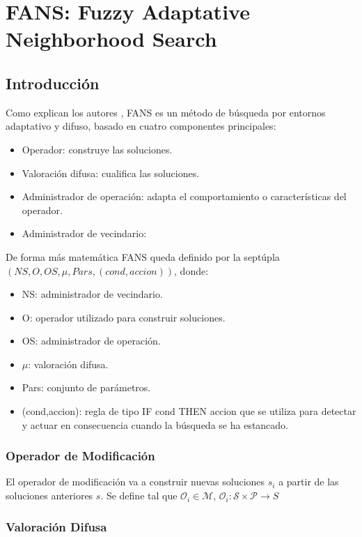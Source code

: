 \section{FANS: Fuzzy Adaptative Neighborhood Search}

\subsection{Introducción}

Como explican los autores \cite{blanco2003fans}, FANS es un método de búsqueda por entornos adaptativo y difuso, basado en cuatro componentes principales:
\begin{itemize}
    \item Operador: construye las soluciones.
    \item Valoración difusa: cualifica las soluciones.
    \item Administrador de operación: adapta el comportamiento o características del operador.
    \item Administrador de vecindario: 
\end{itemize}

De forma más matemática FANS queda definido por la septúpla $(NS,O,OS,\mu,Pars,(cond,accion))$, donde:
\begin{itemize}
    \item NS: administrador de vecindario.
    \item O: operador utilizado para construir soluciones.
    \item OS: administrador de operación.
    \item $\mu$: valoración difusa.
    \item Pars: conjunto de parámetros.
    \item (cond,accion): regla de tipo IF cond THEN accion que se utiliza para detectar y actuar en consecuencia cuando la búsqueda se ha estancado.
\end{itemize}

\subsubsection{Operador de Modificación}
El operador de modificación va a construir nuevas soluciones $s_i$ a partir de las soluciones anteriores $s$. Se define tal que $\mathcal{O}_i \in \mathcal{M}$, $\mathcal{O}_i : \mathcal{S} \times \mathcal{P} \rightarrow S$


\subsubsection{Valoración Difusa}

